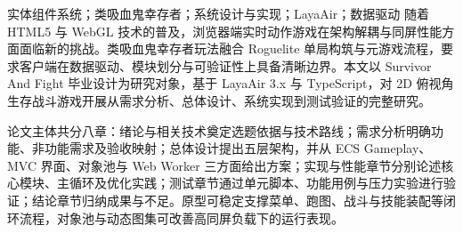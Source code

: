 \begin{cnabstract}{实体组件系统；类吸血鬼幸存者；系统设计与实现；LayaAir；数据驱动}
随着 HTML5 与 WebGL 技术的普及，浏览器端实时动作游戏在架构解耦与同屏性能方面面临新的挑战。类吸血鬼幸存者玩法融合 Roguelite 单局构筑与元游戏流程，要求客户端在数据驱动、模块划分与可验证性上具备清晰边界。本文以 Survivor And Fight 毕业设计为研究对象，基于 LayaAir 3.x 与 TypeScript，对 2D 俯视角生存战斗游戏开展从需求分析、总体设计、系统实现到测试验证的完整研究。

论文主体共分八章：绪论与相关技术奠定选题依据与技术路线；需求分析明确功能、非功能需求及验收映射；总体设计提出五层架构，并从 ECS Gameplay、MVC 界面、对象池与 Web Worker 三方面给出方案；实现与性能章节分别论述核心模块、主循环及优化实践；测试章节通过单元脚本、功能用例与压力实验进行验证；结论章节归纳成果与不足。原型可稳定支撑菜单、跑图、战斗与技能装配等闭环流程，对象池与动态图集可改善高同屏负载下的运行表现。
\end{cnabstract}
